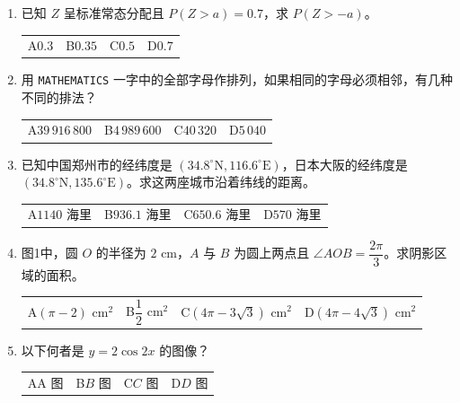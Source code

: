 \documentclass[12pt,a4paper]{exam-zh}
\makeatletter
\newcommand{\optline}[4]{%
  \begin{tabular*}{\linewidth}{@{\extracolsep{\fill}}llll}
  A\;#1 & B\;#2 & C\;#3 & D\;#4
  \end{tabular*}}
\makeatother
\begin{document}
\begin{enumerate}[leftmargin=2.2em,label=\arabic*.,start=9]
\item 已知 $Z$ 呈标准常态分配且 $P(Z>a)=0.7$，求 $P(Z>-a)$。\\
\optline{$0.3$}{$0.35$}{$0.5$}{$0.7$}

\item 用 \texttt{MATHEMATICS} 一字中的全部字母作排列，如果相同的字母必须相邻，有几种不同的排法？\\
\optline{$39\,916\,800$}{$4\,989\,600$}{$40\,320$}{$5\,040$}

\item 已知中国郑州市的经纬度是 $(34.8^\circ\mathrm N,116.6^\circ\mathrm E)$，日本大阪的经纬度是 $(34.8^\circ\mathrm N,135.6^\circ\mathrm E)$。求这两座城市沿着纬线的距离。\\
\optline{$1140$ 海里}{$936.1$ 海里}{$650.6$ 海里}{$570$ 海里}

\item 图1中，圆 $O$ 的半径为 $2\text{ cm}$，$A$ 与 $B$ 为圆上两点且 $\angle AOB=\dfrac{2\pi}{3}$。求阴影区域的面积。\\
\optline{$(\pi-2)\text{ cm}^2$}{$\dfrac12\text{ cm}^2$}{$(4\pi-3\sqrt3)\text{ cm}^2$}{$(4\pi-4\sqrt3)\text{ cm}^2$}

\item 以下何者是 $y=2\cos 2x$ 的图像？\\
\optline{A 图}{$B$ 图}{$C$ 图}{$D$ 图}

\begin{center}
\end{center}
\end{enumerate}

\newpage
\end{document}
